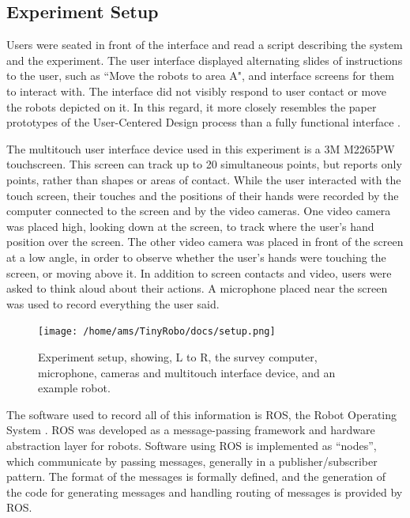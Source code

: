 \subsection{Experiment Setup} \label{section:Experiment_Setup}

Users were seated in front of the interface and read a script describing the system and the experiment. The user interface displayed alternating slides of instructions to the user, such as ``Move the robots to area A", and interface screens for them to interact with. 
The interface did not visibly respond to user contact or move the robots depicted on it.
In this regard, it more closely resembles the paper prototypes of the User-Centered Design process than a fully functional interface \citep{ehn1992cardboard}.

The multitouch user interface device used in this experiment is a 3M M2265PW touchscreen. 
This screen can track up to 20 simultaneous points, but reports only points, rather than shapes or areas of contact. 
While the user interacted with the touch screen, their touches and the positions of their hands were recorded by the computer connected to the screen and by the video cameras. 
One video camera was placed high, looking down at the screen, to track where the user's hand position over the screen. 
The other video camera was placed in front of the screen at a low angle, in order to observe whether the user's hands were touching the screen, or moving above it. 
In addition to screen contacts and video, users were asked to think aloud about their actions.
A microphone placed near the screen was used to record everything the user said. 

\begin{figure}
	\centering
	\texttt{[image: /home/ams/TinyRobo/docs/setup.png]}
	\caption{Experiment setup, showing, L to R, the survey computer, microphone, cameras and multitouch interface device, and an example robot.}
	\label{fig:experiment_setup}
\end{figure}

The software used to record all of this information is ROS, the Robot Operating System \citep{ROS_announcement_paper}. 
ROS was developed as a message-passing framework and hardware abstraction layer for robots. 
Software using ROS is implemented as ``nodes'', which communicate by passing messages, generally in a publisher/subscriber pattern. 
The format of the messages is formally defined, and the generation of the code for generating messages and handling routing of messages is provided by ROS. 

